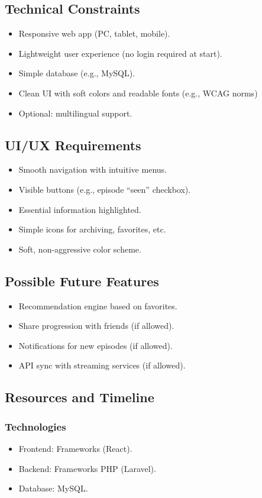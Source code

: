 \subsection{Technical Constraints}
\begin{itemize}
    \item Responsive web app (PC, tablet, mobile).
    \item Lightweight user experience (no login required at start).
    \item Simple database (e.g., MySQL).
    \item Clean UI with soft colors and readable fonts (e.g., WCAG norms)
    \item Optional: multilingual support.
\end{itemize}

\subsection{UI/UX Requirements}
\begin{itemize}
    \item Smooth navigation with intuitive menus.
    \item Visible buttons (e.g., episode “seen” checkbox).
    \item Essential information highlighted.
    \item Simple icons for archiving, favorites, etc.
    \item Soft, non-aggressive color scheme.
\end{itemize}

\subsection{Possible Future Features}
\begin{itemize}
    \item Recommendation engine based on favorites.
    \item Share progression with friends (if allowed).
    \item Notifications for new episodes (if allowed).
    \item API sync with streaming services (if allowed).
\end{itemize}

\subsection{Resources and Timeline}

\subsubsection{Technologies}
\begin{itemize}
    \item Frontend: Frameworks (React).
    \item Backend: Frameworks PHP (Laravel).
    \item Database: MySQL.
\end{itemize}

